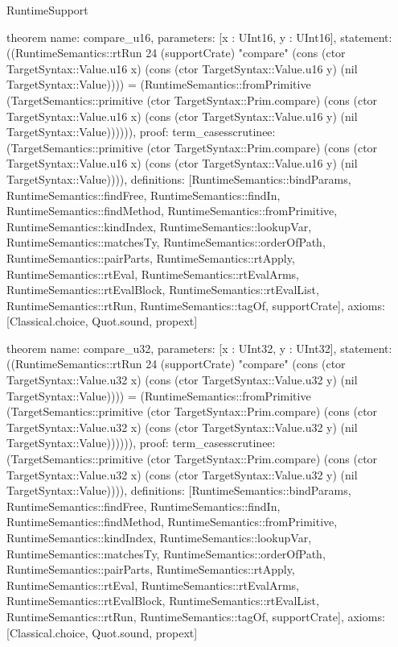 \begin{lexlean}{RuntimeSupport}
\begin{semanticmodule}
theorem{
  name: compare_u16,
  parameters: [x : UInt16, y : UInt16],
  statement: ((RuntimeSemantics::rtRun 24 (supportCrate) "compare" (cons (ctor TargetSyntax::Value.u16 x) (cons (ctor TargetSyntax::Value.u16 y) (nil TargetSyntax::Value)))) = (RuntimeSemantics::fromPrimitive (TargetSemantics::primitive (ctor TargetSyntax::Prim.compare) (cons (ctor TargetSyntax::Value.u16 x) (cons (ctor TargetSyntax::Value.u16 y) (nil TargetSyntax::Value)))))),
  proof: term_cases{scrutinee: (TargetSemantics::primitive (ctor TargetSyntax::Prim.compare) (cons (ctor TargetSyntax::Value.u16 x) (cons (ctor TargetSyntax::Value.u16 y) (nil TargetSyntax::Value)))), definitions: [RuntimeSemantics::bindParams, RuntimeSemantics::findFree, RuntimeSemantics::findIn, RuntimeSemantics::findMethod, RuntimeSemantics::fromPrimitive, RuntimeSemantics::kindIndex, RuntimeSemantics::lookupVar, RuntimeSemantics::matchesTy, RuntimeSemantics::orderOfPath, RuntimeSemantics::pairParts, RuntimeSemantics::rtApply, RuntimeSemantics::rtEval, RuntimeSemantics::rtEvalArms, RuntimeSemantics::rtEvalBlock, RuntimeSemantics::rtEvalList, RuntimeSemantics::rtRun, RuntimeSemantics::tagOf, supportCrate]},
  axioms: [Classical.choice, Quot.sound, propext]
}

theorem{
  name: compare_u32,
  parameters: [x : UInt32, y : UInt32],
  statement: ((RuntimeSemantics::rtRun 24 (supportCrate) "compare" (cons (ctor TargetSyntax::Value.u32 x) (cons (ctor TargetSyntax::Value.u32 y) (nil TargetSyntax::Value)))) = (RuntimeSemantics::fromPrimitive (TargetSemantics::primitive (ctor TargetSyntax::Prim.compare) (cons (ctor TargetSyntax::Value.u32 x) (cons (ctor TargetSyntax::Value.u32 y) (nil TargetSyntax::Value)))))),
  proof: term_cases{scrutinee: (TargetSemantics::primitive (ctor TargetSyntax::Prim.compare) (cons (ctor TargetSyntax::Value.u32 x) (cons (ctor TargetSyntax::Value.u32 y) (nil TargetSyntax::Value)))), definitions: [RuntimeSemantics::bindParams, RuntimeSemantics::findFree, RuntimeSemantics::findIn, RuntimeSemantics::findMethod, RuntimeSemantics::fromPrimitive, RuntimeSemantics::kindIndex, RuntimeSemantics::lookupVar, RuntimeSemantics::matchesTy, RuntimeSemantics::orderOfPath, RuntimeSemantics::pairParts, RuntimeSemantics::rtApply, RuntimeSemantics::rtEval, RuntimeSemantics::rtEvalArms, RuntimeSemantics::rtEvalBlock, RuntimeSemantics::rtEvalList, RuntimeSemantics::rtRun, RuntimeSemantics::tagOf, supportCrate]},
  axioms: [Classical.choice, Quot.sound, propext]
}


\end{semanticmodule}
\end{lexlean}
